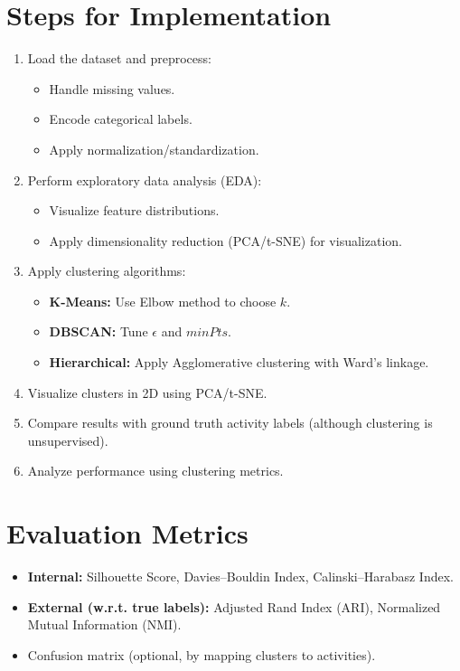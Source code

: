 \documentclass[11pt]{article}
\begin{document}
\section*{Steps for Implementation}
\begin{enumerate}[label=\arabic*.]
    \item Load the dataset and preprocess:
    \begin{itemize}
        \item Handle missing values.
        \item Encode categorical labels.
        \item Apply normalization/standardization.
    \end{itemize}
    \item Perform exploratory data analysis (EDA):
    \begin{itemize}
        \item Visualize feature distributions.
        \item Apply dimensionality reduction (PCA/t-SNE) for visualization.
    \end{itemize}
    \item Apply clustering algorithms:
    \begin{itemize}
        \item \textbf{K-Means:} Use Elbow method to choose $k$.
        \item \textbf{DBSCAN:} Tune $\epsilon$ and $minPts$.
        \item \textbf{Hierarchical:} Apply Agglomerative clustering with Ward’s linkage.
    \end{itemize}
    \item Visualize clusters in 2D using PCA/t-SNE.
    \item Compare results with ground truth activity labels (although clustering is unsupervised).
    \item Analyze performance using clustering metrics.
\end{enumerate}

\section*{Evaluation Metrics}
\begin{itemize}
    \item \textbf{Internal:} Silhouette Score, Davies–Bouldin Index, Calinski–Harabasz Index.
    \item \textbf{External (w.r.t. true labels):} Adjusted Rand Index (ARI), Normalized Mutual Information (NMI).
    \item Confusion matrix (optional, by mapping clusters to activities).
\end{itemize}
\end{document}
